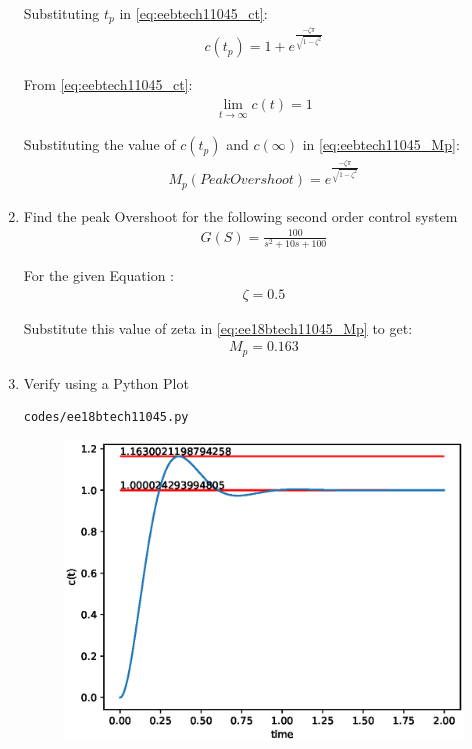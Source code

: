 \begin{enumerate}[label=\thesubsection.\arabic*.,ref=\thesubsection.\theenumi]
Substituting $t_p$ in \eqref{eq:eebtech11045_ct}:
\begin{align}
    c(t_p) = 1 + e^{\frac{-\zeta\pi}{\sqrt{1-\zeta^2}}}
\end{align}

From \eqref{eq:eebtech11045_ct}:
\begin{align}
    \lim_{t \to \infty} c(t) = 1
\end{align}

Substituting the value of $c(t_p)$ and $c(\infty)$ in \eqref{eq:eebtech11045_Mp}:
\begin{align}
    M_p (PeakOvershoot) = e^{\frac{-\zeta\pi}{\sqrt{1-\zeta^2}}}
    \label{eq:ee18btech11045_Mp}
\end{align}

\item Find the peak Overshoot for the following second order control system
\begin{align}
    G(S) = \frac{100}{s^2 + 10s +100}
\end{align}

\solution

For the given Equation : 
\begin{align}
   \zeta = 0.5
\end{align}

Substitute this value of zeta in \eqref{eq:ee18btech11045_Mp} to get:
\begin{align}
     M_p = 0.163
\end{align}

\item Verify using a Python Plot

\solution

\begin{lstlisting}
codes/ee18btech11045.py
\end{lstlisting}

\begin{figure}[!h]
    \centering
    \includegraphics[width=\columnwidth]{figs/ee18btech11045/ee18btech11045.eps}
\end{figure}

\end{enumerate}